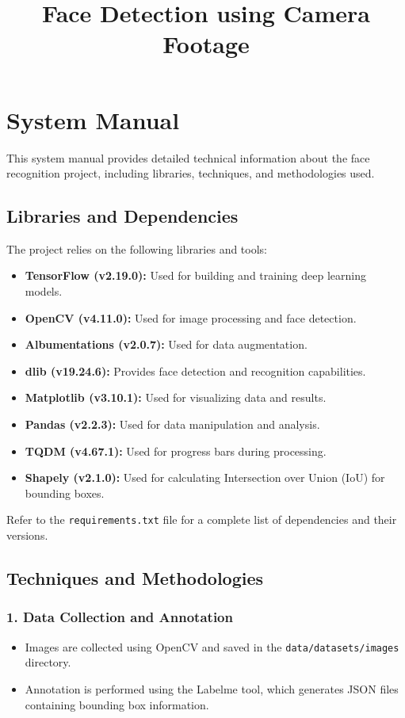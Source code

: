 \documentclass[a4paper]{feidipsp}
\title{Face Detection using Camera Footage}
\begin{document}


\titulnastrana

\tableofcontents

\newpage

\setcounter{page}{1}

\section{System Manual}

This system manual provides detailed technical information about the face recognition project, including libraries, techniques, and methodologies used.

\subsection{Libraries and Dependencies}

The project relies on the following libraries and tools:

\begin{itemize}
    \item \textbf{TensorFlow (v2.19.0):} Used for building and training deep learning models.
    \item \textbf{OpenCV (v4.11.0):} Used for image processing and face detection.
    \item \textbf{Albumentations (v2.0.7):} Used for data augmentation.
    \item \textbf{dlib (v19.24.6):} Provides face detection and recognition capabilities.
    \item \textbf{Matplotlib (v3.10.1):} Used for visualizing data and results.
    \item \textbf{Pandas (v2.2.3):} Used for data manipulation and analysis.
    \item \textbf{TQDM (v4.67.1):} Used for progress bars during processing.
    \item \textbf{Shapely (v2.1.0):} Used for calculating Intersection over Union (IoU) for bounding boxes.
\end{itemize}

Refer to the \texttt{requirements.txt} file for a complete list of dependencies and their versions.

\subsection{Techniques and Methodologies}

\subsubsection{1. Data Collection and Annotation}
\begin{itemize}
    \item Images are collected using OpenCV and saved in the \texttt{data/datasets/images} directory.
    \item Annotation is performed using the Labelme tool, which generates JSON files containing bounding box information.
\end{itemize}
\end{document}
